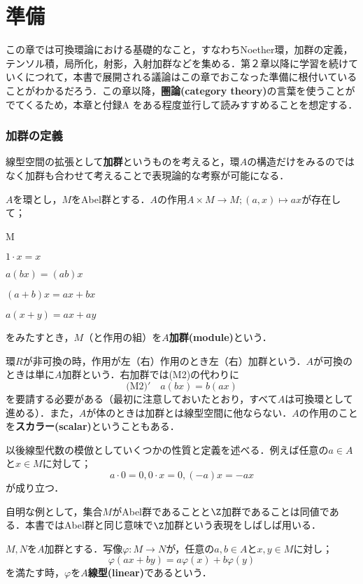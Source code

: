 \part[Preliminaries]{準備}
この章では可換環論における基礎的なこと，すなわちNoether環，加群の定義，テンソル積，局所化，射影，入射加群などを集める．第２章以降に学習を続けていくにつれて，本書で展開される議論はこの章でおこなった準備に根付いていることがわかるだろう．この章以降，\textbf{圏論(category theory)}の言葉を使うことがでてくるため，本章と付録A をある程度並行して読みすすめることを想定する．

\section{加群の定義}

線型空間の拡張として\textbf{加群}というものを考えると，環$A$の構造だけをみるのではなく加群も合わせて考えることで表現論的な考察が可能になる．

\begin{defi}[加群]
	$A$を環とし，$M$をAbel群とする．$A$の作用$A\times M\to M;(a,x)\mapsto ax$が存在して；
	\begin{defiterm}{M}
		\item $1\cdot x=x$
		\item $a(bx)=(ab)x$
		\item $(a+b)x=ax+bx$
		\item $a(x+y)=ax+ay$
	\end{defiterm}
	をみたすとき，$M$（と作用の組）を$A$\textbf{加群(module)}という．
\end{defi}

環$R$が非可換の時，作用が左（右）作用のとき左（右）加群という．$A$が可換のときは単に$A$加群という．右加群では(M2)の代わりに
\[\textrm{(M2)}'\quad a(bx)=b(ax)\]
を要請する必要がある（最初に注意しておいたとおり，すべて$A$は可換環として進める）．また，$A$が体のときは加群とは線型空間に他ならない．$A$の作用のことを\textbf{スカラー(scalar)}ということもある．

以後線型代数の模倣としていくつかの性質と定義を述べる．例えば任意の$a\in A$と$x\in M$に対して；
\[a\cdot0=0, 0\cdot x=0,(-a)x=-ax\]
が成り立つ．

自明な例として，集合$M$がAbel群であることと$\Z$加群であることは同値である．本書ではAbel群と同じ意味で$\Z$加群という表現をしばしば用いる．
\begin{defi}[線型写像]
	$M,N$を$A$加群とする．写像$\varphi:M\to N$が，任意の$a,b\in A$と$x,y\in M$に対し；
	\[\varphi(ax+by)=a\varphi(x)+b\varphi(y)\]
	を満たす時，$\varphi$を$A$\textbf{線型(linear)}であるという．
\end{defi}

